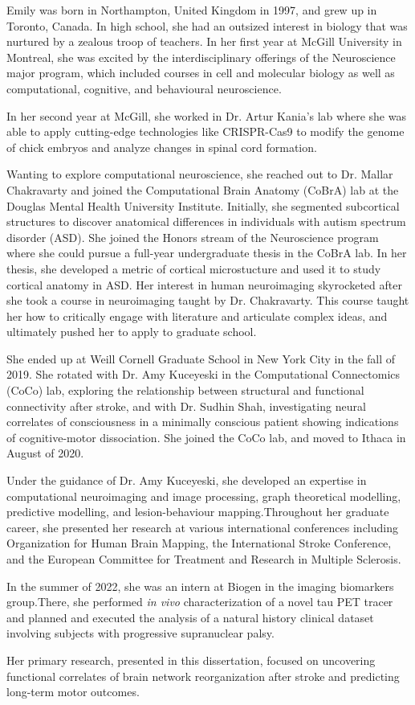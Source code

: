 \documentclass[phd,tocprelim]{cornell}
\begin{document}
\begin{biosketch}
Emily was born in Northampton, United Kingdom in 1997, and grew up in Toronto, Canada.  In high school, she had an outsized interest in biology that was nurtured by a zealous troop of teachers.  In her first year at McGill University in Montreal, she was excited by the interdisciplinary offerings of the Neuroscience major program, which included courses in cell and molecular biology as well as computational,  cognitive, and behavioural neuroscience.

In her second year at McGill, she worked in Dr. Artur Kania's lab where she was able to apply cutting-edge technologies like CRISPR-Cas9 to modify the genome of chick embryos and analyze changes in spinal cord formation. 

Wanting to explore computational neuroscience, she reached out to Dr. Mallar Chakravarty and joined the Computational Brain Anatomy (CoBrA) lab at the Douglas Mental Health University Institute. Initially, she segmented subcortical structures to discover anatomical differences in individuals with autism spectrum disorder (ASD). She joined the Honors stream of the Neuroscience program where she could pursue a full-year undergraduate thesis in the CoBrA lab.  In her thesis, she developed a metric of cortical microstucture and used it to study cortical anatomy in ASD. Her interest in human neuroimaging skyrocketed after she took a course in neuroimaging taught by Dr. Chakravarty. This course taught her how to critically engage with literature and articulate complex ideas, and ultimately pushed her to apply to graduate school.

She ended up at Weill Cornell Graduate School in New York City in the fall of 2019. She rotated with Dr. Amy Kuceyeski in the Computational Connectomics (CoCo) lab, exploring the relationship between structural and functional connectivity after stroke, and with Dr. Sudhin Shah,  investigating neural correlates of consciousness in a  minimally conscious patient showing indications of cognitive-motor dissociation. She joined the CoCo lab, and moved to Ithaca in August of 2020. 

Under the guidance of Dr. Amy Kuceyeski, she developed an expertise in computational neuroimaging and image processing, graph theoretical modelling, predictive modelling, and lesion-behaviour mapping.Throughout her graduate career, she presented her research at various international conferences including Organization for Human Brain Mapping, the International Stroke Conference,  and the European Committee for Treatment and Research in Multiple Sclerosis.

In the summer of 2022, she was an intern at Biogen in the imaging biomarkers group.There, she performed \textit{in vivo} characterization of a novel tau PET tracer and planned and executed the analysis of a natural history clinical dataset involving subjects with progressive supranuclear palsy.

Her primary research, presented in this dissertation, focused on uncovering functional correlates of brain network reorganization after stroke and predicting long-term motor outcomes. 

\end{biosketch}
\end{document}
